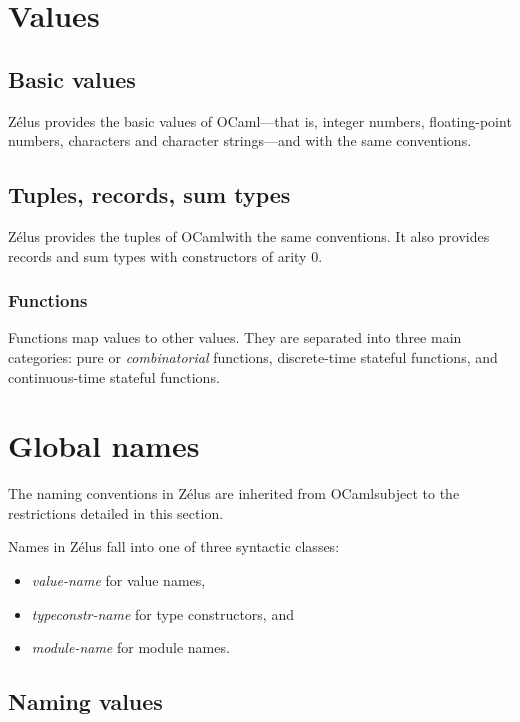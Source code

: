 \documentclass[11pt,titlepage,twoside]{report}
\newcommand{\zelus}{{\sf Z\'elus}}
\newcommand{\ocaml}{{\sf OCaml}}
\newcommand{\nterm}[1]{\textcolor{BrickRed}{\it #1}}
\newcommand{\nterm}[1]{{\em #1}}
\begin{document}
\section{Values\label{values}} %
\subsection{Basic values\label{basicvalues}} %

\zelus{} provides the basic values of \ocaml{}---that is, integer numbers, 
floating-point numbers, characters and character strings---and with the same
conventions.

\subsection{Tuples, records, sum types\label{tuplesrecords}} %

\zelus{} provides the tuples of \ocaml with the same conventions. It
also provides records and sum types with constructors of arity 0.

\subsubsection{Functions\label{funcvalues}} %

Functions map values to other values.
They are separated into three main
categories: pure or \emph{combinatorial} functions, discrete-time stateful 
functions, and continuous-time stateful functions.

\section{Global names\label{global-names}} %

The naming conventions in \zelus{} are inherited from \ocaml subject to the
restrictions detailed in this section.

Names in \zelus{} fall into one of three syntactic classes:
\begin{itemize}
\item \nterm{value-name} for value names,
\item \nterm{typeconstr-name} for type constructors, and
\item \nterm{module-name} for module names.
\end{itemize}

\subsection{Naming values\label{namingvalues}} %
\end{document}
